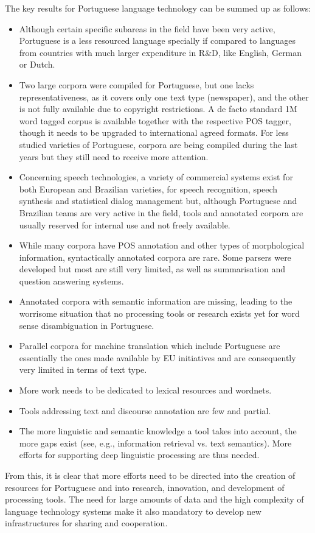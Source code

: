 \begin{multicols}{2}
The key results for Portuguese language technology can be summed up as follows:

\begin{itemize}
      \item Although certain specific subareas in the field have been very active, Portuguese is a less resourced language specially if compared to languages from countries with much larger expenditure in R\&D, like English, German or Dutch.
      \item Two large corpora were compiled for Portuguese, but one lacks representativeness, as it covers only one text type (newspaper), and the other is not fully available due to copyright restrictions. A de facto standard 1M word tagged corpus is available together with the respective POS tagger, though it needs to be upgraded to international agreed formats. For less studied varieties of Portuguese, corpora are being compiled during the last years but they still need to receive more attention.
     \item Concerning speech technologies, a variety of commercial systems exist for both European and Brazilian varieties, for speech recognition, speech synthesis and statistical dialog management but, although Portuguese and Brazilian teams are very active in the field, tools and annotated corpora are usually reserved for internal use and not freely available.
    \item While many corpora have POS annotation and other types of morphological information, syntactically annotated corpora are rare. Some parsers were developed but most are still very limited,  as well as summarisation and question answering systems.
    \item Annotated corpora with semantic information are missing, leading to the worrisome situation that no processing tools or research exists yet for word sense disambiguation in Portuguese. 
    \item Parallel corpora for machine translation which include Portuguese are essentially the ones made available by EU initiatives and are consequently very limited in terms of text type.
   \item More work needs to be dedicated to lexical resources and wordnets.
   \item Tools addressing text and discourse annotation are few and partial.
   \item The more linguistic and semantic knowledge a tool takes into account, the more gaps exist (see, e.g., information retrieval vs. text semantics). More efforts for supporting deep linguistic processing are thus needed.
    \end{itemize}
   From this, it is clear that more efforts need to be directed into the creation of resources for Portuguese and into research, innovation, and development of processing tools. The need for large amounts of data and the high complexity of language technology systems make it also mandatory to develop new infrastructures for sharing and cooperation.


\end{multicols}
